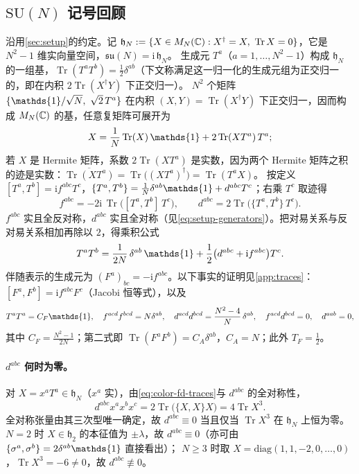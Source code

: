 \documentclass[UTF8,a4paper,11pt,fontset=fandol]{ctexart}
\let\amsmathbb\mathbb
\renewcommand{\mathbb}[1]{\ifx1#1\mathds{1}\else\amsmathbb{#1}\fi}
\theoremstyle{cplain}
\theoremstyle{cdefinition}
\theoremstyle{cremark}
\numberwithin{equation}{section}
\DeclareMathOperator{\Tr}{Tr}
\newcommand{\su}{\mathfrak{su}}
\newcommand{\ii}{\mathrm{i}}                        %
\begin{document}
\subsection{\texorpdfstring{$\mathrm{SU}(N)$}{SU(N)} 记号回顾}\label{sec:color-recap}

沿用\cref{sec:setup}的约定。记 $\mathfrak h_N:=\{X\in M_N(\mathbb C):X^\dagger=X,\ \Tr X=0\}$，它是 $N^2-1$ 维实向量空间，$\su(N)=\ii\,\mathfrak h_N$。
生成元 $T^a$（$a=1,\dots,N^2-1$）构成 $\mathfrak h_N$ 的一组基，$\Tr(T^aT^b)=\tfrac12\delta^{ab}$（下文称满足这一归一化的生成元组为正交归一的，即在内积 $2\Tr(X^\dagger Y)$ 下正交归一）。
$N^2$ 个矩阵 $\{\mathbb 1/\sqrt N,\ \sqrt2\,T^a\}$ 在内积 $(X,Y)=\Tr(X^\dagger Y)$ 下正交归一，因而构成 $M_N(\mathbb C)$ 的基，任意复矩阵可展开为
\begin{equation}\label{eq:color-complete}
X=\frac1N\Tr(X)\,\mathbb 1+2\Tr(XT^a)\,T^a ;
\end{equation}
若 $X$ 是 Hermite 矩阵，系数 $2\Tr(XT^a)$ 是实数，因为两个 Hermite 矩阵之积的迹是实数：$\overline{\Tr(XT^a)}=\Tr\bigl((XT^a)^\dagger\bigr)=\Tr(T^aX)$。
按定义 $[T^a,T^b]=\ii f^{abc}T^c$，$\{T^a,T^b\}=\frac1N\delta^{ab}\mathbb 1+d^{abc}T^c$；右乘 $T^c$ 取迹得
\begin{equation}\label{eq:color-fd-traces}
f^{abc}=-2\ii\,\Tr\bigl([T^a,T^b]\,T^c\bigr),\qquad d^{abc}=2\Tr\bigl(\{T^a,T^b\}\,T^c\bigr).
\end{equation}
$f^{abc}$ 实且全反对称，$d^{abc}$ 实且全对称（见\cref{eq:setup-generators}）。把对易关系与反对易关系相加再除以 $2$，得乘积公式
\begin{equation}\label{eq:color-TT}
T^aT^b=\frac{1}{2N}\,\delta^{ab}\,\mathbb 1+\frac12\bigl(d^{abc}+\ii f^{abc}\bigr)T^c .
\end{equation}
伴随表示的生成元为 $(F^a)_{bc}=-\ii f^{abc}$。以下事实的证明见\cref{app:traces}：$[F^a,F^b]=\ii f^{abc}F^c$（Jacobi 恒等式），以及
\begin{equation}\label{eq:color-contractions}
T^aT^a=C_F\mathbb 1,\quad f^{acd}f^{bcd}=N\delta^{ab},\quad d^{acd}d^{bcd}=\frac{N^2-4}{N}\,\delta^{ab},\quad f^{acd}d^{bcd}=0,\quad d^{aab}=0,
\end{equation}
其中 $C_F=\frac{N^2-1}{2N}$；第二式即 $\Tr(F^aF^b)=C_A\delta^{ab}$，$C_A=N$；此外 $T_F=\tfrac12$。

\paragraph{$d^{abc}$ 何时为零。}
对 $X=x^aT^a\in\mathfrak h_N$（$x^a$ 实），由\cref{eq:color-fd-traces}与 $d^{abc}$ 的全对称性，
\begin{equation}\label{eq:color-dxxx}
d^{abc}x^ax^bx^c=2\Tr\bigl(\{X,X\}X\bigr)=4\Tr X^3 .
\end{equation}
全对称张量由其三次型唯一确定，故 $d^{abc}\equiv0$ 当且仅当 $\Tr X^3$ 在 $\mathfrak h_N$ 上恒为零。
$N=2$ 时 $X\in\mathfrak h_2$ 的本征值为 $\pm\lambda$，故 $d^{abc}\equiv0$（亦可由 $\{\sigma^a,\sigma^b\}=2\delta^{ab}\mathbb 1$ 直接看出）；
$N\ge3$ 时取 $X=\mathrm{diag}(1,1,-2,0,\dots,0)$，$\Tr X^3=-6\neq0$，故 $d^{abc}\not\equiv0$。
\end{document}
